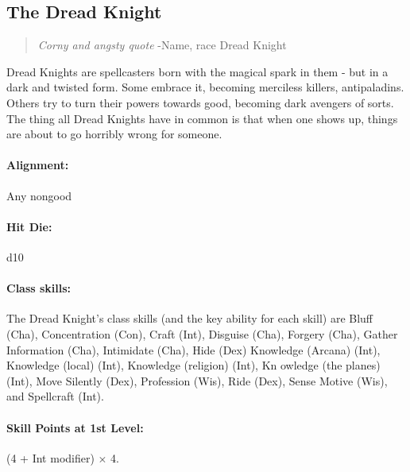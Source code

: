 \subsection[Dread Knight]{The Dread Knight}
\begin{quote}
\emph{Corny and angsty quote}
-Name, race Dread Knight
\end{quote}

Dread Knights are spellcasters born with the magical spark in them - but in a dark and twisted form.
Some embrace it, becoming merciless killers, antipaladins.
Others try to turn their powers towards good, becoming dark avengers of sorts.
The thing all Dread Knights have in common is that when one shows up, things are about to go horribly wrong for someone.
\paragraph{Alignment:} Any nongood
\paragraph{Hit Die:} d10
\paragraph{Class skills:}
The Dread Knight's class skills (and the key ability for each skill) are
Bluff (Cha), Concentration (Con), Craft (Int), Disguise (Cha), Forgery (Cha), Gather Information (Cha),
Intimidate (Cha), Hide (Dex) Knowledge (Arcana) (Int), Knowledge (local) (Int),
Knowledge (religion) (Int), Kn	owledge (the planes) (Int), Move Silently (Dex),
Profession (Wis), Ride (Dex), Sense Motive (Wis), and Spellcraft (Int).

\paragraph{Skill Points at 1st Level:} (4 + Int modifier) $\times$ 4.
